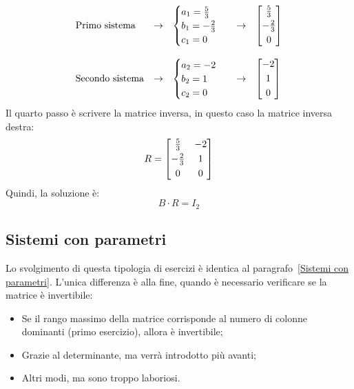 \documentclass[a4paper]{article}
\makeatletter
\newenvironment{rowequmatbra}[1]{\left[\array{@{}#1@{}}}{\endarray\right]}
\makeatother
\begin{document}
	\begin{equation*}
		\begin{array}{lllll}
			\text{Primo sistema}	& \rightarrow & \begin{cases}
				a_{1} = \frac{5}{3}  \\
				b_{1} = -\frac{2}{3} \\
				c_{1} = 0
			\end{cases} & \rightarrow & \begin{rowequmatbra}{c}
				\frac{5}{3}  \\ [0.3em]
				-\frac{2}{3} \\ [0.3em]
				0
			\end{rowequmatbra} \\
			\\
			\text{Secondo sistema}	& \rightarrow & \begin{cases}
				a_{2} = -2 \\
				b_{2} =  1  \\
				c_{2} =  0
			\end{cases} & \rightarrow & \begin{rowequmatbra}{c}
				-2 \\ [0.3em]
				 1 \\ [0.3em]
				 0
			\end{rowequmatbra}
		\end{array}
	\end{equation*}
	Il \textcolor{Red3}{quarto passo} è scrivere la matrice inversa, in questo caso la matrice inversa destra:
	\begin{equation*}
		R = \begin{rowequmatbra}{cc}
			\frac{5}{3}	 & -2 \\ [0.3em]
			-\frac{2}{3} &  1 \\ [0.3em]
			0			 &  0
		\end{rowequmatbra}
	\end{equation*}
	Quindi, la soluzione è:
	\begin{equation*}
		B \cdot R = I_{2}
	\end{equation*}\newpage

	\subsection{Sistemi con parametri}
	
	Lo svolgimento di questa tipologia di esercizi è identica al paragrafo~\ref{Sistemi con parametri}. L'unica differenza è alla fine, quando è necessario verificare se la matrice è invertibile:
	\begin{itemize}
		\item Se il rango massimo della matrice corrisponde al numero di colonne dominanti (primo esercizio), allora è invertibile;
		\item Grazie al determinante, ma verrà introdotto più avanti;	
		\item Altri modi, ma sono troppo laboriosi.
	\end{itemize}	
\end{document}
